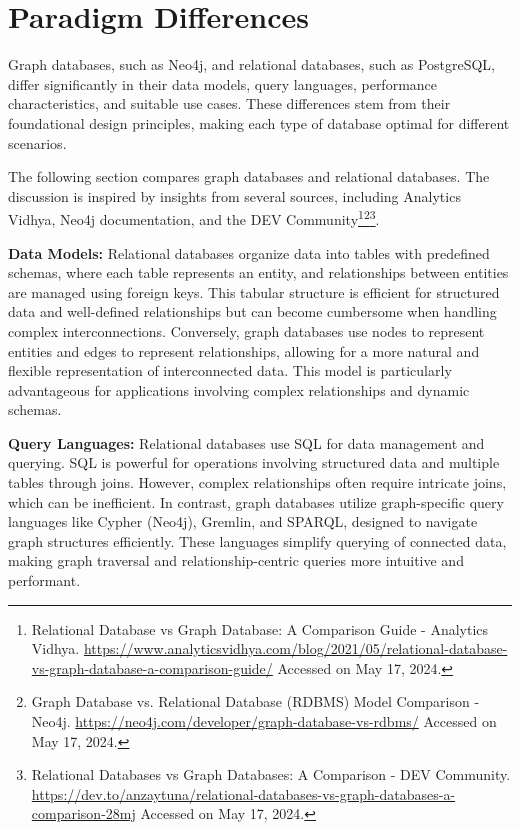 \section{Paradigm Differences}
Graph databases, such as Neo4j, and relational databases, such as PostgreSQL, differ significantly in their data models, query languages, performance characteristics, and suitable use cases. These differences stem from their foundational design principles, making each type of database optimal for different scenarios.

The following section compares graph databases and relational databases. The discussion is inspired by insights from several sources, including Analytics Vidhya, Neo4j documentation, and the DEV Community\footnote{Relational Database vs Graph Database: A Comparison Guide - Analytics Vidhya. \url{https://www.analyticsvidhya.com/blog/2021/05/relational-database-vs-graph-database-a-comparison-guide/} Accessed on May 17, 2024.}\footnote{Graph Database vs. Relational Database (RDBMS) Model Comparison - Neo4j. \url{https://neo4j.com/developer/graph-database-vs-rdbms/} Accessed on May 17, 2024.}\footnote{Relational Databases vs Graph Databases: A Comparison - DEV Community. \url{https://dev.to/anzaytuna/relational-databases-vs-graph-databases-a-comparison-28mj} Accessed on May 17, 2024.}.

\textbf{Data Models:} Relational databases organize data into tables with predefined schemas, where each table represents an entity, and relationships between entities are managed using foreign keys. This tabular structure is efficient for structured data and well-defined relationships but can become cumbersome when handling complex interconnections. Conversely, graph databases use nodes to represent entities and edges to represent relationships, allowing for a more natural and flexible representation of interconnected data. This model is particularly advantageous for applications involving complex relationships and dynamic schemas.

\textbf{Query Languages:} Relational databases use SQL for data management and querying. SQL is powerful for operations involving structured data and multiple tables through joins. However, complex relationships often require intricate joins, which can be inefficient. In contrast, graph databases utilize graph-specific query languages like Cypher (Neo4j), Gremlin, and SPARQL, designed to navigate graph structures efficiently. These languages simplify querying of connected data, making graph traversal and relationship-centric queries more intuitive and performant.

